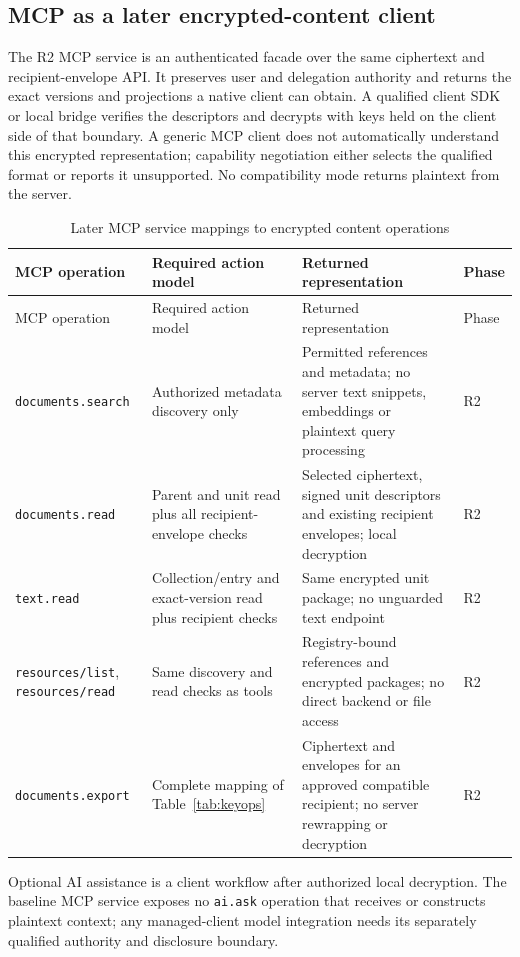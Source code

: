 \documentclass[11pt,a4paper]{article}
\newcommand{\code}[1]{{\small\nolinkurl{#1}}}
\begin{document}
\subsection{MCP as a later encrypted-content client}
The R2 MCP service is an authenticated facade over the same ciphertext and recipient-envelope API. It preserves user and delegation authority and returns the exact versions and projections a native client can obtain. A qualified client SDK or local bridge verifies the descriptors and decrypts with keys held on the client side of that boundary. A generic MCP client does not automatically understand this encrypted representation; capability negotiation either selects the qualified format or reports it unsupported. No compatibility mode returns plaintext from the server.
\begin{longtable}{@{}P{0.22\textwidth}P{0.27\textwidth}P{0.32\textwidth}P{0.08\textwidth}@{}}
\caption{Later MCP service mappings to encrypted content operations}\label{tab:mcpops}\\
\toprule MCP operation & Required action model & Returned representation & Phase\\\midrule\endfirsthead
\toprule MCP operation & Required action model & Returned representation & Phase\\\midrule\endhead
\code{documents.search} & Authorized metadata discovery only & Permitted references and metadata; no server text snippets, embeddings or plaintext query processing & R2\\
\code{documents.read} & Parent and unit read plus all recipient-envelope checks & Selected ciphertext, signed unit descriptors and existing recipient envelopes; local decryption & R2\\
\code{text.read} & Collection/entry and exact-version read plus recipient checks & Same encrypted unit package; no unguarded text endpoint & R2\\
\code{resources/list}, \code{resources/read} & Same discovery and read checks as tools & Registry-bound references and encrypted packages; no direct backend or file access & R2\\
\code{documents.export} & Complete mapping of Table~\ref{tab:keyops} & Ciphertext and envelopes for an approved compatible recipient; no server rewrapping or decryption & R2\\
\bottomrule
\end{longtable}
Optional AI assistance is a client workflow after authorized local decryption. The baseline MCP service exposes no \code{ai.ask} operation that receives or constructs plaintext context; any managed-client model integration needs its separately qualified authority and disclosure boundary.
\end{document}
